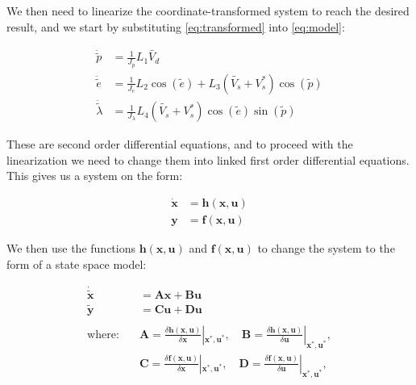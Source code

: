 We then need to linearize the coordinate-transformed system to reach the desired result, and we start by substituting \cref{eq:transformed} into \cref{eq:model}:

\begin{subequations}
    \begin{aligned}
        \ddot{\tilde{p}} &= \frac{1}{J_{p}} L_{1} \tilde{V_{d}} \\
        \ddot{\tilde{e}} &= \frac{1}{J_{e}} L_{2} \cos(\tilde{e}) + L_{3} (\tilde{V_{s}} + V_{s}^*) \cos(\tilde{p}) \\
        \ddot{\tilde{\lambda}} &= \frac{1}{J_{\lambda}} L_{4} (\tilde{V_{s}} + V_{s}^*) \cos(\tilde{e}) \sin(\tilde{p})
    \end{aligned}
\end{subequations}

These are second order differential equations, and to proceed with the linearization we need to change them into linked first order differential equations. This gives us a system on the form:


\begin{equation}
    \begin{aligned}
    \mathbf{\dot{x}} &= \mathbf{h}(\mathbf{x},\mathbf{u}) \\
    \mathbf{y} &= \mathbf{f}(\mathbf{x},\mathbf{u}) 
    \end{aligned}
\end{equation}


We then use the functions $\mathbf{h}(\mathbf{x},\mathbf{u})$ and 
    $\mathbf{f}(\mathbf{x},\mathbf{u})$ to change the system to the form of a state space model:

\begin{equation}
    \begin{aligned}
    \mathbf{\dot{\tilde{x}}} &= \mathbf{A x} + \mathbf{B u} \\
    \mathbf{ \tilde{y}} &= \mathbf{C u} + \mathbf{D u} \\ \\
    \textrm{where:} 
    \quad&\mathbf{A} = \frac{\delta \mathbf{h(x,u)}}{\delta \mathbf{x}} |_{\mathbf{x^*, u^*}}, 
    \quad \mathbf{B} = \frac{\delta \mathbf{h(x,u)}}{\delta \mathbf{u}} |_{\mathbf{x^*, u^*}}, \\
    \quad&\mathbf{C} = \frac{\delta \mathbf{f(x,u)}}{\delta \mathbf{x}} |_{\mathbf{x^*, u^*}},
    \quad \mathbf{D} = \frac{\delta \mathbf{f(x,u)}}{\delta \mathbf{u}} |_{\mathbf{x^*, u^*}},
    \end{aligned}
\end{equation}

